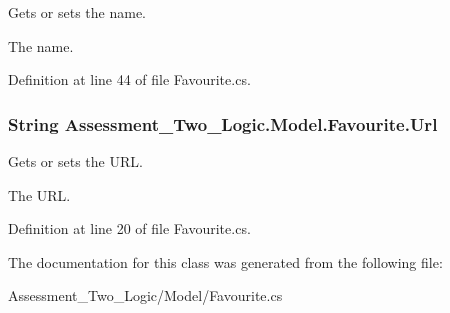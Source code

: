 Gets or sets the name. 

The name.

Definition at line 44 of file Favourite.cs.

\hypertarget{class_assessment___two___logic_1_1_model_1_1_favourite_a7fba4e0ed5a0349820317b07bd1df63a}{
\subsubsection[{Url}]{\setlength{\rightskip}{0pt plus 5cm}String Assessment\_\-Two\_\-Logic.Model.Favourite.Url}}
\label{class_assessment___two___logic_1_1_model_1_1_favourite_a7fba4e0ed5a0349820317b07bd1df63a}


Gets or sets the URL. 

The URL.

Definition at line 20 of file Favourite.cs.



The documentation for this class was generated from the following file:\begin{DoxyCompactItemize}
\item 
Assessment\_\-Two\_\-Logic/Model/Favourite.cs\end{DoxyCompactItemize}
